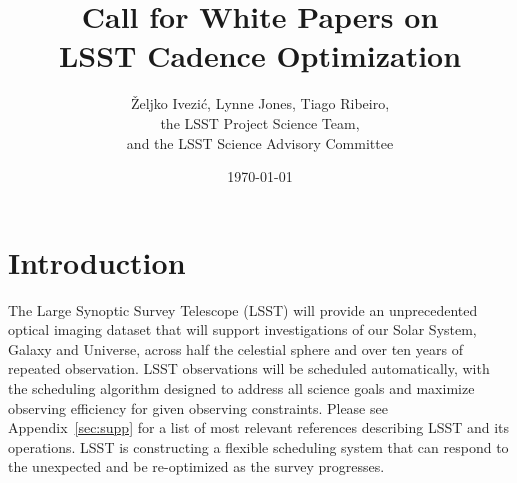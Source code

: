\documentclass[DM,lsstdraft,toc,usenatbib]{lsstdoc}
\title[Call for LSST Cadence White Papers]{Call for White Papers on \\ LSST Cadence Optimization}
\author{\v{Z}eljko Ivezi\'{c}, Lynne Jones, Tiago Ribeiro, \\
                 the LSST Project Science Team, \\
                 and  the LSST Science Advisory Committee}
\date{\today}
\begin{document}
\maketitle


\section{Introduction} 

The Large Synoptic Survey Telescope (LSST) will provide an unprecedented optical 
imaging dataset that will support investigations of our Solar System, Galaxy and Universe, 
across half the celestial sphere and over ten years of repeated observation. LSST observations will be
scheduled automatically, with the scheduling algorithm designed to address all science goals 
and maximize observing efficiency for given observing constraints. Please see Appendix~\ref{sec:supp}
for a list of most relevant references describing LSST and its operations. LSST is constructing a 
flexible scheduling system that can respond to the unexpected and be re-optimized as the survey progresses.
\end{document}
